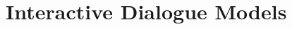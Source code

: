 \documentclass[../DD.tex]{subfiles}
\begin{document}
\chapter{Interactive Dialogue Models}
\thispagestyle{fancy}
		
		
				
\end{document}

